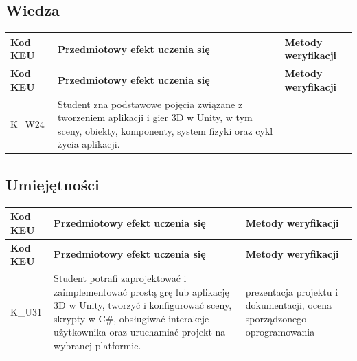 \documentclass[12pt, a4paper]{article}
\newcommand{\thdrule}{\noalign{\global\setlength{\extrarowheight}{0pt}}}
\newcommand{\thdend}{\noalign{\global\setlength{\extrarowheight}{3pt}}}
\begin{document}
\subsection*{Wiedza}
{\scriptsize
\begin{longtable}{m{1.6cm}m{9.0cm}m{4.2cm}}
\thdrule\toprule
\rowcolor{pjatkRed} {\color{white}\footnotesize\textbf{\vphantom{Ag}Kod KEU}} & {\color{white}\footnotesize\textbf{\vphantom{Ag}Przedmiotowy efekt uczenia się}} & {\color{white}\footnotesize\textbf{\vphantom{Ag}Metody weryfikacji}} \\
\midrule\thdend
\endfirsthead
\thdrule\toprule
\rowcolor{pjatkRed} {\color{white}\footnotesize\textbf{\vphantom{Ag}Kod KEU}} & {\color{white}\footnotesize\textbf{\vphantom{Ag}Przedmiotowy efekt uczenia się}} & {\color{white}\footnotesize\textbf{\vphantom{Ag}Metody weryfikacji}} \\
\midrule\thdend
\endhead
  \rowcolor{tableRowLight} K\_W24 & Student zna podstawowe pojęcia związane z tworzeniem aplikacji i gier 3D w Unity, w tym sceny, obiekty, komponenty, system fizyki oraz cykl życia aplikacji. &  \\
\bottomrule
\end{longtable}}

\subsection*{Umiejętności}
{\scriptsize
\begin{longtable}{m{1.6cm}m{9.0cm}m{4.2cm}}
\thdrule\toprule
\rowcolor{pjatkRed} {\color{white}\footnotesize\textbf{\vphantom{Ag}Kod KEU}} & {\color{white}\footnotesize\textbf{\vphantom{Ag}Przedmiotowy efekt uczenia się}} & {\color{white}\footnotesize\textbf{\vphantom{Ag}Metody weryfikacji}} \\
\midrule\thdend
\endfirsthead
\thdrule\toprule
\rowcolor{pjatkRed} {\color{white}\footnotesize\textbf{\vphantom{Ag}Kod KEU}} & {\color{white}\footnotesize\textbf{\vphantom{Ag}Przedmiotowy efekt uczenia się}} & {\color{white}\footnotesize\textbf{\vphantom{Ag}Metody weryfikacji}} \\
\midrule\thdend
\endhead
  \rowcolor{tableRowLight} K\_U31 & Student potrafi zaprojektować i zaimplementować prostą grę lub aplikację 3D w Unity, tworzyć i konfigurować sceny, skrypty w C\#, obsługiwać interakcje użytkownika oraz uruchamiać projekt na wybranej platformie. & prezentacja projektu i dokumentacji, ocena sporządzonego oprogramowania \\
\bottomrule
\end{longtable}}
\end{document}
